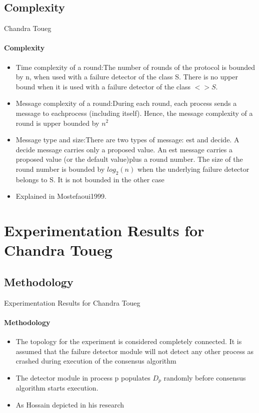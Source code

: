 \documentclass[11pt]{beamer}              %
\begin{document}
\subsection{Complexity}
\begin{frame}{Chandra Toueg}
\framesubtitle{Complexity}
\begin{itemize}
\item \alert{Time complexity of a round:}The number of rounds of the protocol is bounded by n, when used with a failure detector
of the class S. There is no upper bound when it is used with a failure detector of the class \(<>S\).
\item \alert{Message complexity of a round:}During each round, each process sends a message to eachprocess (including itself).
Hence, the message complexity of a round is upper bounded by \(n^2\)
\item \alert{Message type and size:}There are two types of message: \alert{est} and \alert{decide}. A decide message carries only a proposed
value. An est message carries a proposed value (or the default value)plus a round number. The size of the round number
is bounded by \(log_2(n)\) when the underlying failure detector belongs to S. It is not bounded in the other case
\item Explained in \cite{Mostefaoui1999}\alert{Mostefaoui1999}.
\end{itemize}
\end{frame}

\section{Experimentation Results for Chandra Toueg}

\subsection{Methodology}
\begin{frame}{Experimentation Results for Chandra Toueg}
\framesubtitle{Methodology}
\begin{itemize}
\item The topology for the experiment is considered completely connected. It is assumed that the failure detector module will
not detect any other process as crashed during execution of the consensus algorithm
\item The detector module
in process p populates \(D_p\) randomly before consensus algorithm starts execution.
\item As \cite{Hossain}\alert{Hossain} depicted in his research
\end{itemize}
\end{frame}
\end{document}

